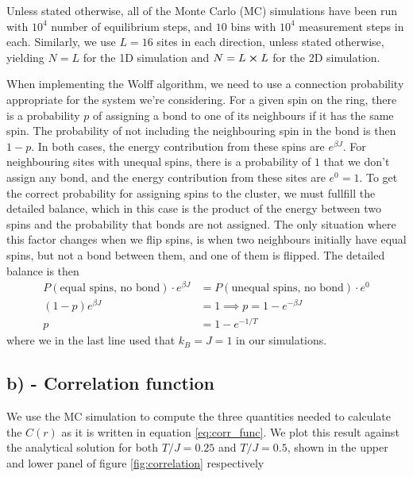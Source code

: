 \documentclass[reprint,english,notitlepage,aps,nobalancelastpage,nofootinbib]{revtex4-1}
\newcommand{\ebj}{e^{\beta J}}
\newcommand{\tj}{T/J}
\begin{document}
Unless stated otherwise, all of the Monte Carlo (MC) simulations have been run with $10^4$ number of equilibrium steps, and $10$ bins with $10^4$ measurement steps in each. Similarly, we use $L=16$ sites in each direction, unless stated otherwise, yielding $N=L$ for the 1D simulation and $N=L\cross L$ for the 2D simulation. 

When implementing the Wolff algorithm, we need to use a connection probability appropriate for the system we're considering. For a given spin on the ring, there is a probability $p$ of assigning a bond to one of its neighbours if it has the same spin. The probability of not including the neighbouring spin in the bond is then $1-p$. In both cases, the energy contribution from these spins are $\ebj$. For neighbouring sites with unequal spins, there is a probability of $1$ that we don't assign any bond, and the energy contribution from these sites are $e^0=1$. To get the correct probability for assigning spins to the cluster, we must fullfill the detailed balance, which in this case is the product of the energy between two spins and the probability that bonds are not assigned. The only situation where this factor changes when we flip spins, is when two neighbours initially have equal spins, but not a bond between them, and one of them is flipped. The detailed balance is then 
\begin{align}
	P(\text{equal spins, no bond})\cdot e^{\beta J} &= P(\text{unequal spins, no bond})\cdot e^{0} \nonumber  \\ 
	(1-p)\ebj &= 1 \nonumber \implies p = 1-e^{-\beta J} \\ 
	p &= 1 - e^{-1/T} \label{eq:connection_probability}
\end{align}      
where we in the last line used that $k_B=J=1$ in our simulations. 

\subsection*{b) - Correlation function}
We use the MC simulation to compute the three quantities needed to calculate the $C(r)$ as it is written in equation \eqref{eq:corr_func}. We plot this result against the analytical solution for both $\tj=0.25$ and $\tj=0.5$, shown in the upper and lower panel of figure \ref{fig:correlation} respectively
\end{document}
